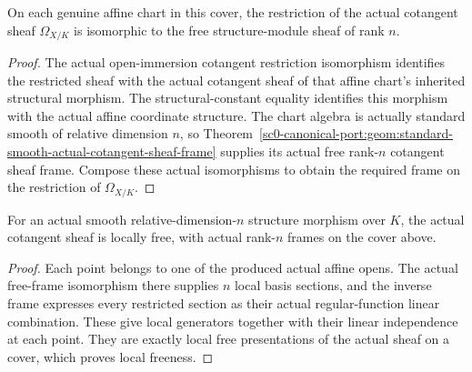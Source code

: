 \begin{theorem}
\label{sc0-canonical-port:geom:smooth-scheme-actual-cotangent-chart-frame}
\leanok
On each genuine affine chart in this cover, the restriction
of the actual cotangent sheaf \(\Omega_{X/K}\) is
isomorphic to the free structure-module sheaf of rank \(n\).
\end{theorem}
\begin{proof}
The actual open-immersion cotangent restriction isomorphism
identifies the restricted sheaf with the actual cotangent
sheaf of that affine chart's inherited structural morphism.
The structural-constant equality identifies this morphism
with the actual affine coordinate structure. The chart
algebra is actually standard smooth of relative dimension
\(n\), so Theorem~\ref{sc0-canonical-port:geom:standard-smooth-actual-cotangent-sheaf-frame}
supplies its actual free rank-\(n\) cotangent sheaf frame.
Compose these actual isomorphisms to obtain the required
frame on the restriction of \(\Omega_{X/K}\).
\end{proof}

\begin{corollary}
\label{sc0-canonical-port:geom:smooth-scheme-actual-cotangent-locally-free}
\leanok
For an actual smooth relative-dimension-\(n\) structure
morphism over \(K\), the actual cotangent sheaf is locally
free, with actual rank-\(n\) frames on the cover above.
\end{corollary}
\begin{proof}
Each point belongs to one of the produced actual affine
opens. The actual free-frame isomorphism there supplies
\(n\) local basis sections, and the inverse frame
expresses every restricted section as their actual
regular-function linear combination. These give local
generators together with their linear independence at each
point. They are exactly local free presentations of the
actual sheaf on a cover, which proves local freeness.
\end{proof}

